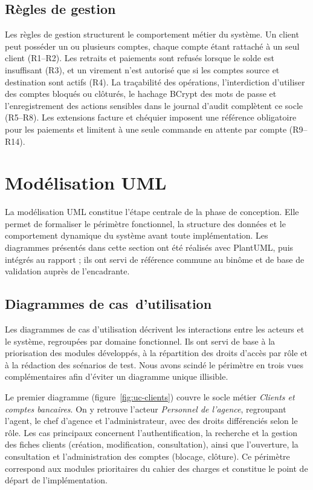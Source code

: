 \documentclass[11pt,a4paper,oneside]{report}
\begin{document}
\subsection{Règles de gestion}

Les règles de gestion structurent le comportement métier du système. Un client peut posséder un ou plusieurs comptes, chaque compte étant rattaché à un seul client (R1--R2). Les retraits et paiements sont refusés lorsque le solde est insuffisant (R3), et un virement n'est autorisé que si les comptes source et destination sont actifs (R4). La traçabilité des opérations, l'interdiction d'utiliser des comptes bloqués ou clôturés, le hachage BCrypt des mots de passe et l'enregistrement des actions sensibles dans le journal d'audit complètent ce socle (R5--R8). Les extensions facture et chéquier imposent une référence obligatoire pour les paiements et limitent à une seule commande en attente par compte (R9--R14).

\section{Modélisation UML}

La modélisation UML constitue l'étape centrale de la phase de conception. Elle permet de formaliser le périmètre fonctionnel, la structure des données et le comportement dynamique du système avant toute implémentation. Les diagrammes présentés dans cette section ont été réalisés avec PlantUML, puis intégrés au rapport ; ils ont servi de référence commune au binôme et de base de validation auprès de l'encadrante.

\subsection{Diagrammes de cas~d'utilisation}

Les diagrammes de cas d'utilisation décrivent les interactions entre les acteurs et le système, regroupées par domaine fonctionnel. Ils ont servi de base à la priorisation des modules développés, à la répartition des droits d'accès par rôle et à la rédaction des scénarios de test. Nous avons scindé le périmètre en trois vues complémentaires afin d'éviter un diagramme unique illisible.

Le premier diagramme (figure~\ref{fig:uc-clients}) couvre le socle métier \emph{Clients et comptes bancaires}. On y retrouve l'acteur \emph{Personnel de l'agence}, regroupant l'agent, le chef d'agence et l'administrateur, avec des droits différenciés selon le rôle. Les cas principaux concernent l'authentification, la recherche et la gestion des fiches clients (création, modification, consultation), ainsi que l'ouverture, la consultation et l'administration des comptes (blocage, clôture). Ce périmètre correspond aux modules prioritaires du cahier des charges et constitue le point de départ de l'implémentation.
\end{document}
